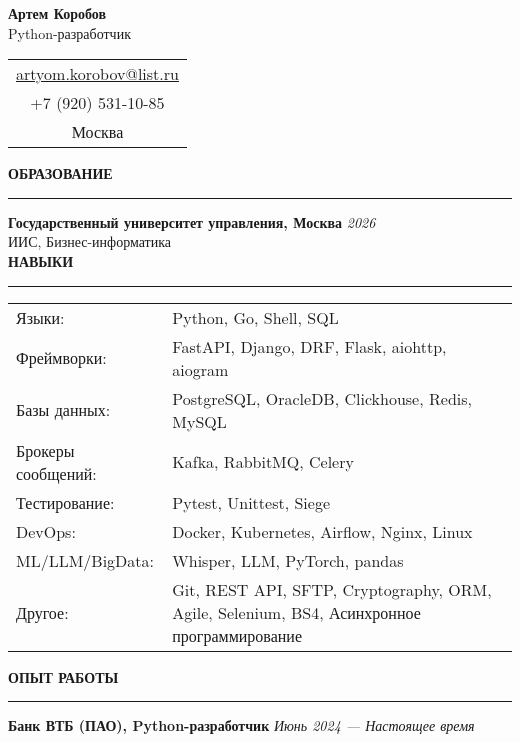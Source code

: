 \documentclass[11pt]{article}
\newcommand{\sectionheader}[1]{%
    \vspace{8pt}%
    \noindent\textbf{\large #1} \\
    \vspace{-8pt}%
    \rule{\textwidth}{0.5pt}%
    \vspace{6pt}%
}
\begin{document}
\begin{center}
    \LARGE \textbf{Артем Коробов} \\
    \large Python-разработчик \\[5pt]
\end{center}
\begin{center}
    \begin{tabular}{c}
        \href{mailto:artyom.korobov@list.ru}{artyom.korobov@list.ru} \\
        +7 (920) 531-10-85 \\
        Москва \\
    \end{tabular}
\end{center}
\sectionheader{ОБРАЗОВАНИЕ}
\textbf{Государственный университет управления, Москва} \hfill \textit{2026} \\
ИИС, Бизнес-информатика \\
\sectionheader{НАВЫКИ}
\begin{tabular}{@{}p{} p{}@{}}
    Языки: & Python, Go, Shell, SQL \\
    Фреймворки: & FastAPI, Django, DRF, Flask, aiohttp, aiogram \\
    Базы данных: & PostgreSQL, OracleDB, Clickhouse, Redis, MySQL \\
    Брокеры сообщений: & Kafka, RabbitMQ, Celery \\
    Тестирование: & Pytest, Unittest, Siege \\
    DevOps: & Docker, Kubernetes, Airflow, Nginx, Linux \\
    ML/LLM/BigData: & Whisper, LLM, PyTorch, pandas \\
    Другое: & Git, REST API, SFTP, Cryptography, ORM, Agile, Selenium, BS4, Асинхронное программирование \\
\end{tabular}
\sectionheader{ОПЫТ РАБОТЫ}
\textbf{Банк ВТБ (ПАО), Python-разработчик} \hfill \textit{Июнь 2024 — Настоящее время} \\
\end{document}
